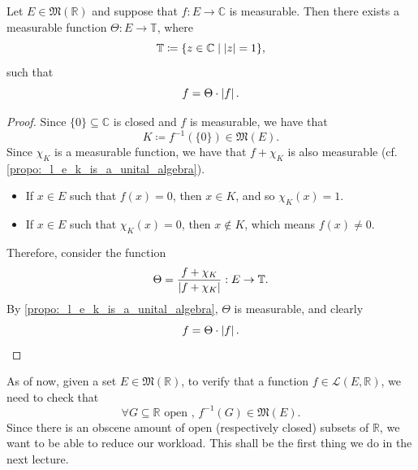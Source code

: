 \documentclass[notoc,notitlepage]{tufte-book}
\begin{document}
\begin{propo}\label{propo:measurable_function_broken_down_into_an_absolute_part_and_a_scaling_part}
  Let $E \in \mathfrak{M}(\mathbb{R})$ and suppose that $f : E \to \mathbb{C}$ 
  is measurable. Then there exists a measurable function $\Theta : E \to
  \mathbb{T}$, where
  \begin{equation*}
    \mathbb{T} \coloneqq \{ z \in \mathbb{C} \mid \left|z\right| = 1 \},
  \end{equation*}
  such that
  \begin{equation*}
    f = \Theta \cdot \left|f\right|.
  \end{equation*}
\end{propo}

\begin{proof}
  Since $\{ 0 \} \subseteq \mathbb{C}$ is closed and $f$ is measurable, we have
  that
  \begin{equation*}
    K \coloneqq f^{-1}(\{0\}) \in \mathfrak{M}(E).
  \end{equation*}
  Since $\chi_K$ is a measurable function, we have that $f + \chi_K$ is also
  measurable (cf. \cref{propo:_l_e_k_is_a_unital_algebra}).

  \noindent
  \begin{itemize}
    \item If $x \in E$ such that $f(x) = 0$, then $x \in K$, and so $\chi_K(x) =
      1$.
    \item If $x \in E$ such that $\chi_K(x) = 0$, then $x \notin K$, which means
      $f(x) \neq 0$.
  \end{itemize}

  Therefore, consider the function
  \begin{equation*}
    \Theta = \frac{f + \chi_K}{\left|f + \chi_K\right|} : E \to \mathbb{T}.
  \end{equation*}
  By \cref{propo:_l_e_k_is_a_unital_algebra}, $\Theta$ is measurable, and
  clearly
  \begin{equation*}
    f = \Theta \cdot \left|f\right|.
  \end{equation*}
\end{proof}

\begin{remark}
  As of now, given a set $E \in \mathfrak{M}(\mathbb{R})$, to verify that a
  function $f \in \mathcal{L}(E, \mathbb{R})$, we need to check that
  \begin{equation*}
    \forall G \subseteq \mathbb{R} \text{ open },\, f^{-1}(G) \in
    \mathfrak{M}(E).
  \end{equation*}
  Since there is an obscene amount of open (respectively closed) subsets of
  $\mathbb{R}$, we want to be able to reduce our workload. This shall be the
  first thing we do in the next lecture.
\end{remark}
\end{document}
